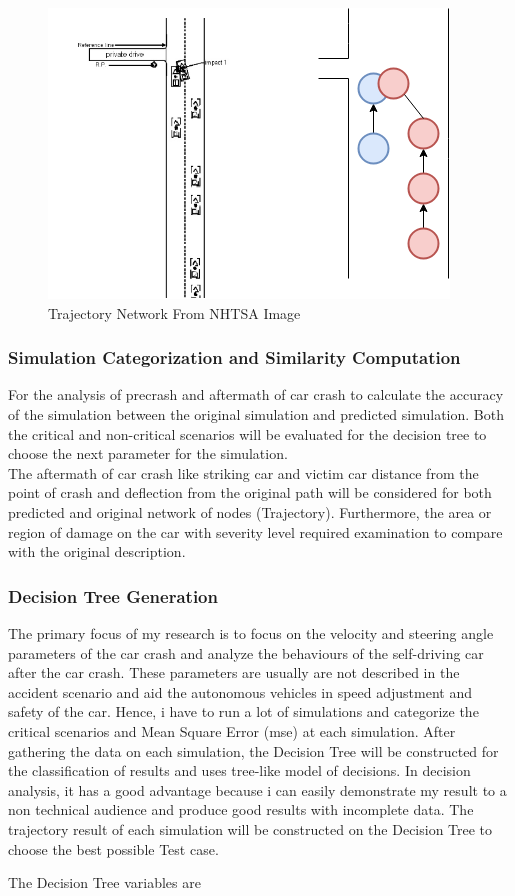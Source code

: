 \begin{figure}[H]
\centering
  \includegraphics[scale= 0.4]{pictures/SO1_NET.png}
  \caption{Trajectory Network From NHTSA Image}
\end{figure}


\subsubsection{Simulation Categorization and Similarity Computation}
For the analysis of precrash and aftermath of car crash to calculate the accuracy of the simulation between the original simulation and predicted simulation. Both the critical and non-critical scenarios will be evaluated for the decision tree to choose the next parameter for the simulation.\\
The aftermath of car crash like striking car and victim car distance from the point of crash and deflection from the original path will be considered for both predicted and original network of nodes (Trajectory). Furthermore, the area or region of damage on the car with severity level required examination to compare with the original description.   


\subsubsection{Decision Tree Generation}

The primary focus of my research is to focus on the velocity and steering angle parameters of the car crash and analyze the behaviours of the self-driving car after the car crash. These parameters are usually are not described in the accident scenario and aid the autonomous vehicles in speed adjustment and safety of the car. Hence, i have to run a lot of simulations and categorize the critical scenarios and Mean Square Error (mse) at each simulation. After gathering the data on each simulation, the Decision Tree will be constructed for the classification of results and uses tree-like model of decisions. In decision analysis, it has a good advantage because i can easily demonstrate my result to a non technical audience and produce good results with incomplete data. The trajectory result of each simulation will be constructed on the Decision Tree to choose the best possible Test case. \par 
The Decision Tree variables are

